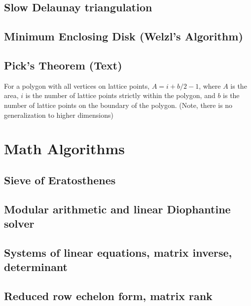 \documentclass[9pt]{extarticle}
\begin{document}
\begin{multicols}{3}
\subsection{Slow Delaunay triangulation}


\subsection{Minimum Enclosing Disk (Welzl's Algorithm)}


\subsection{Pick's Theorem (Text)}

For a polygon with all vertices on lattice points, $A = i + b/2 - 1$, where $A$ is the area, $i$ is the number of lattice points strictly within the polygon, and $b$ is the number of lattice points on the boundary of the polygon. (Note, there is no generalization to higher dimensions)

\section{Math Algorithms}

\subsection{Sieve of Eratosthenes}


\subsection{Modular arithmetic and linear Diophantine solver}


\subsection{Systems of linear equations, matrix inverse, determinant}


\subsection{Reduced row echelon form, matrix rank}



\end{multicols}
\end{document}
